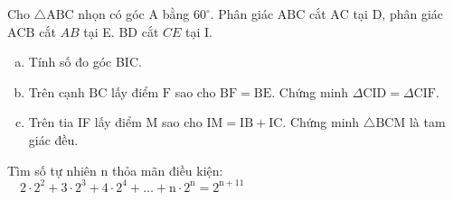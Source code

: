 \begin{bt}
    Cho $\triangle \mathrm{ABC}$ nhọn có góc $\mathrm{A}$ bằng $60^{\circ}$. Phân giác $\mathrm{ABC}$ cắt $\mathrm{AC}$ tại $\mathrm{D}$, phân giác $\mathrm{ACB}$ cắt $A B$ tại E. BD cắt $C E$ tại I.
    \begin{enumerate}[a.]
    \item Tính số đo góc BIC.
    \item Trên cạnh $\mathrm{BC}$ lấy điểm $\mathrm{F}$ sao cho $\mathrm{BF}=\mathrm{BE}$. Chứng minh $\Delta \mathrm{CID}=\Delta \mathrm{CIF}$.
    \item Trên tia IF lấy điểm $\mathrm{M}$ sao cho $\mathrm{IM}=\mathrm{IB}+\mathrm{IC}$. Chứng minh $\triangle \mathrm{BCM}$ là tam giác đều.
    \end{enumerate}
\loigiai{}
\end{bt}

\begin{bt}
    Tìm số tự nhiên $\mathrm{n}$ thỏa mãn điều kiện: $\quad 2 \cdot 2^2+3 \cdot 2^3+4 \cdot 2^4+\ldots+\mathrm{n} \cdot 2^{\mathrm{n}}=2^{\mathrm{n}+11}$
\loigiai{}
\end{bt}
